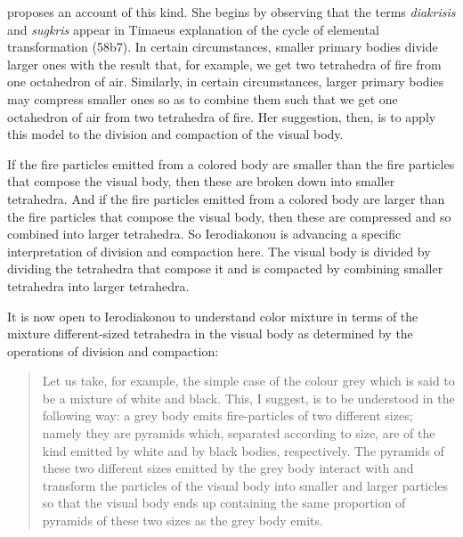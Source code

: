 \citet{Ierodiakonou:2005ly} proposes an account of this kind. She begins by observing that the terms \emph{diakrisis} and \emph{sugkris} appear in Timaeus explanation of the cycle of elemental transformation (58b7). In certain circumstances, smaller primary bodies divide larger ones with the result that, for example, we get two tetrahedra of fire from one octahedron of air. Similarly, in certain circumstances, larger primary bodies may compress smaller ones so as to combine them such that we get one octahedron of air from two tetrahedra of fire. Her suggestion, then, is to apply this model to the division and compaction of the visual body.

If the fire particles emitted from a colored body are smaller than the fire particles that compose the visual body, then these are broken down into smaller tetrahedra. And if the fire particles emitted from a colored body are larger than the fire particles that compose the visual body, then these are compressed and so combined into larger tetrahedra. So Ierodiakonou is advancing a specific interpretation of division and compaction here. The visual body is divided by dividing the tetrahedra that compose it and is compacted by combining smaller tetrahedra into larger tetrahedra.

It is now open to Ierodiakonou to understand color mixture in terms of the mixture different-sized tetrahedra in the visual body as determined by the operations of division and compaction:
\begin{quote}
	Let us take, for example, the simple case of the colour grey which is said to be a mixture of white and black. This, I suggest, is to be understood in the following way: a grey body emits fire-particles of two different sizes; namely they are pyramids which, separated according to size, are of the kind emitted by white and by black bodies, respectively. The pyramids of these two different sizes emitted by the grey body interact with and transform the particles of the visual body into smaller and larger particles so that the visual body ends up containing the same proportion of pyramids of these two sizes as the grey body emits. \citep[228]{Ierodiakonou:2005ly}
\end{quote}

